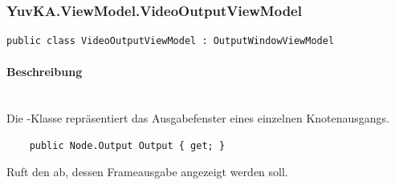 \subsubsection{YuvKA.ViewModel.VideoOutputViewModel}

\begin{verbatim}
public class VideoOutputViewModel : OutputWindowViewModel
\end{verbatim}

\paragraph{Beschreibung}~\\
Die -Klasse repräsentiert das Ausgabefenster eines einzelnen Knotenausgangs.

\begin{itemize}

	\begin{verbatim}
	public Node.Output Output { get; }
	\end{verbatim}
	Ruft den  ab, dessen Frameausgabe angezeigt werden soll.

\end{itemize}
